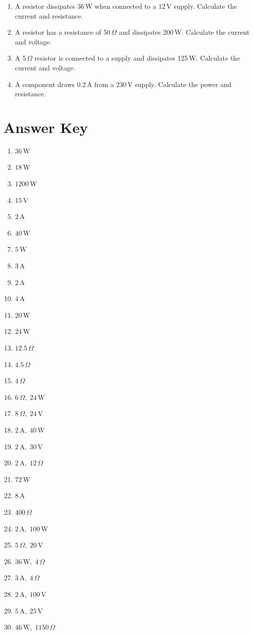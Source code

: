 \documentclass[a4paper,12pt]{article}
\begin{document}
\begin{enumerate}
\item A resistor dissipates 36\,W when connected to a 12\,V supply. Calculate the current and resistance.

\item A resistor has a resistance of 50\,$\Omega$ and dissipates 200\,W. Calculate the current and voltage.

\item A 5\,$\Omega$ resistor is connected to a supply and dissipates 125\,W. Calculate the current and voltage.

\item A component draws 0.2\,A from a 230\,V supply. Calculate the power and resistance.

\end{enumerate}

\newpage

\section*{Answer Key}

\begin{enumerate}

\item $36\,\text{W}$
\item $18\,\text{W}$
\item $1200\,\text{W}$
\item $15\,\text{V}$
\item $2\,\text{A}$
\item $40\,\text{W}$
\item $5\,\text{W}$
\item $3\,\text{A}$
\item $2\,\text{A}$
\item $4\,\text{A}$
\item $20\,\text{W}$
\item $24\,\text{W}$
\item $12.5\,\Omega$
\item $4.5\,\Omega$
\item $4\,\Omega$
\item $6\,\Omega,\; 24\,\text{W}$
\item $8\,\Omega,\; 24\,\text{V}$
\item $2\,\text{A},\; 40\,\text{W}$
\item $2\,\text{A},\; 30\,\text{V}$
\item $2\,\text{A},\; 12\,\Omega$
\item $72\,\text{W}$
\item $8\,\text{A}$
\item $400\,\Omega$
\item $2\,\text{A},\; 100\,\text{W}$
\item $5\,\Omega,\; 20\,\text{V}$
\item $36\,\text{W},\; 4\,\Omega$
\item $3\,\text{A},\; 4\,\Omega$
\item $2\,\text{A},\; 100\,\text{V}$
\item $5\,\text{A},\; 25\,\text{V}$
\item $46\,\text{W},\; 1150\,\Omega$

\end{enumerate}
\end{document}

